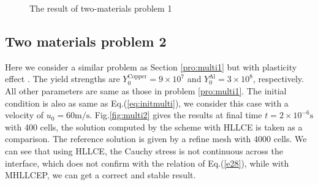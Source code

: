 \documentclass[review]{elsarticle}
\begin{document}
\begin{figure}
      \caption{ The result of two-materials  problem 1}
      \label{fig:multi1}
    \end{figure}

\subsection{Two materials problem 2}
Here we consider a similar problem as Section \ref{pro:multi1} but with plasticity effect . The yield strengths are $Y_0^{\text{Copper}} = 9\times 10^7$ and $Y_0^{\text{Al}} = 3\times 10^8$, respectively. All other  parameters are same as those in problem \ref{pro:multi1}. The initial condition is also as  same as  Eq.(\ref{eq:initmulti}), we consider this case with a velocity of $u_0 = 60 \text{m}/\text{s}$.
Fig.\ref{fig:multi2} gives the results at final time $ t= 2 \times 10^{-6} \text{s}$ with 400 cells, the solution computed by the scheme with HLLCE is taken as a comparison. The reference solution is given by a refine mesh with 4000 cells. We can see that using HLLCE, the Cauchy stress is not continuous across the interface, which does not confirm with the relation of Eq.(\ref{e28}), while with MHLLCEP, we can get a correct and stable result.
\end{document}

